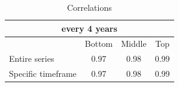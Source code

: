 \begin{table}[h!]
\centering
\caption{Correlations}
\begin{tabular}{|l|c|c|c|}
\hline
\multicolumn{4}{|c|}{every 4 years} \\ \hline
& Bottom & Middle & Top \\ \hline
Entire series & 0.97 & 0.98 & 0.99 \\ \hline
Specific timeframe & 0.97 & 0.98 & 0.99 \\ \hline
\end{tabular}
\end{table}
